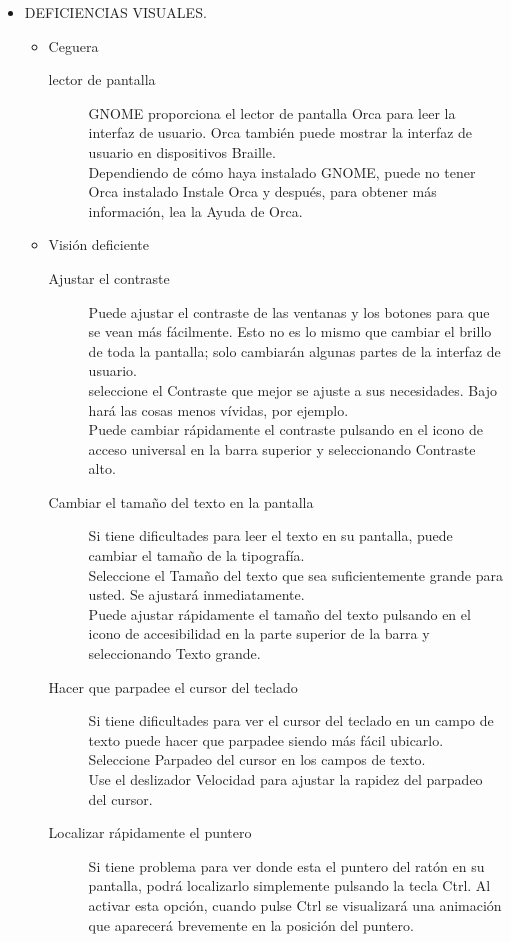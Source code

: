 \begin{itemize}
\item DEFICIENCIAS VISUALES.
\begin{itemize}
\item Ceguera
\begin{description}
\item[lector de pantalla] GNOME proporciona el lector de pantalla Orca para leer la interfaz de usuario. Orca también puede mostrar la interfaz de usuario en dispositivos Braille.\\
Dependiendo de cómo haya instalado GNOME, puede no tener Orca instalado Instale Orca y después, para obtener más información, lea la Ayuda de Orca.
\end{description}
\item Visión deficiente
   \begin{description}
  	\item[Ajustar el contraste] Puede ajustar el contraste de las ventanas y los botones 		para que se vean más fácilmente. Esto no es lo mismo que cambiar el brillo de 				toda la pantalla; solo cambiarán algunas partes de la interfaz de usuario.\\
seleccione el Contraste que mejor se ajuste a sus necesidades. Bajo hará las cosas menos vívidas, por ejemplo.\\
Puede cambiar rápidamente el contraste pulsando en el icono de acceso universal en la barra superior y seleccionando Contraste alto.
  	\item[Cambiar el tamaño del texto en la pantalla] Si tiene dificultades para leer el texto en su pantalla, puede cambiar el tamaño de la tipografía.\\
Seleccione el Tamaño del texto que sea suficientemente grande para usted. Se ajustará inmediatamente.\\
Puede ajustar rápidamente el tamaño del texto pulsando en el icono de accesibilidad en la parte superior de la barra y seleccionando Texto grande.
	\item[Hacer que parpadee el cursor del teclado ] Si tiene dificultades para ver el cursor del teclado en un campo de texto puede hacer que parpadee siendo más fácil ubicarlo.\\
Seleccione Parpadeo del cursor en los campos de texto.\\
Use el deslizador Velocidad para ajustar la rapidez del parpadeo del cursor.
	\item[Localizar rápidamente el puntero] Si tiene problema para ver donde esta el puntero del ratón en su pantalla, podrá localizarlo simplemente pulsando la tecla Ctrl. Al activar esta opción, cuando pulse Ctrl se visualizará una animación que aparecerá brevemente en la posición del puntero.\\

\end{description}
\end{itemize}
\end{itemize}
